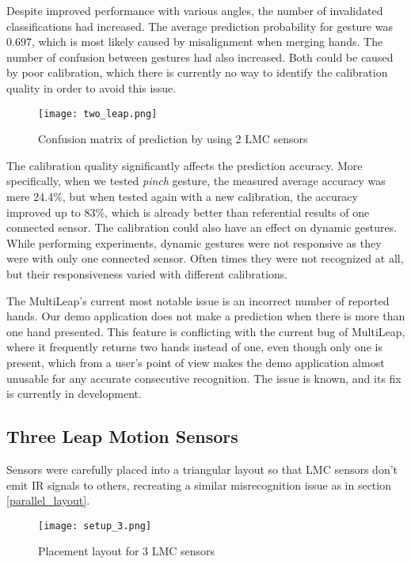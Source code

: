 Despite improved performance with various angles, the number of invalidated classifications had increased. The average prediction probability for gesture was 0.697, which is most likely caused by misalignment when merging hands. The number of confusion between gestures had also increased. Both could be caused by poor calibration, which there is currently no way to identify the calibration quality in order to avoid this issue. 

\begin{figure}[ht]
    \centering
    \texttt{[image: two\_leap.png]}
    \caption{Confusion matrix of prediction by using 2 LMC sensors}
    \label{fig:confuse_2}
\end{figure}

The calibration quality significantly affects the prediction accuracy. More specifically, when we tested \textit{pinch} gesture, the measured average accuracy was mere 24.4\%, but when tested again with a new calibration, the accuracy improved up to 83\%, which is already better than referential results of one connected sensor. The calibration could also have an effect on dynamic gestures. While performing experiments, dynamic gestures were not responsive as they were with only one connected sensor. Often times they were not recognized at all, but their responsiveness varied with different calibrations. 

The MultiLeap's current most notable issue is an incorrect number of reported hands. Our demo application does not make a prediction when there is more than one hand presented. This feature is conflicting with the current bug of MultiLeap, where it frequently returns two hands instead of one, even though only one is present, which from a user's point of view makes the demo application almost unusable for any accurate consecutive recognition. The issue is known, and its fix is currently in development.

\subsection{Three Leap Motion Sensors}

Sensors were carefully placed into a triangular layout so that LMC sensors don't emit IR signals to others, recreating a similar misrecognition issue as in section \ref{parallel_layout}.

\begin{figure}[ht]
    \centering
    \texttt{[image: setup\_3.png]}
    \caption{Placement layout for 3 LMC sensors}
    \label{fig:setup_3}
\end{figure}


